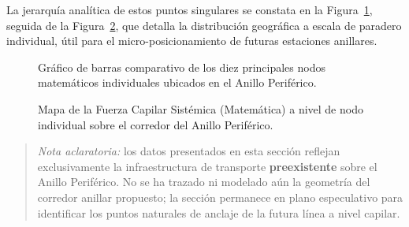 La jerarquía analítica de estos puntos singulares se constata en la
Figura~\ref{fig:barplot-nodos-periferico}, seguida de la
Figura~\ref{fig:mapa-nodos-periferico}, que detalla la distribución geográfica a
escala de paradero individual, útil para el micro-posicionamiento de futuras
estaciones anillares.

\begin{figure}[H]
    \centering
    \caption[Fuerza Capilar de nodos individuales en Anillo Periférico]{
    Gráfico de barras comparativo de los diez principales nodos matemáticos
    individuales ubicados en el Anillo Periférico.}
    \label{fig:barplot-nodos-periferico}
\end{figure}

\begin{figure}[H]
    \centering
    \caption[Distribución espacial de nodos matemáticos en el Periférico]{Mapa
    de la Fuerza Capilar Sistémica (Matemática) a nivel de nodo individual sobre
    el corredor del Anillo Periférico.}
    \label{fig:mapa-nodos-periferico}
\end{figure}

\vspace{2ex}
\begin{quote}
    \small\textit{Nota aclaratoria:} los datos presentados en esta sección
    reflejan exclusivamente la infraestructura de transporte \textbf{preexistente}
    sobre el Anillo Periférico. No se ha trazado ni modelado aún la geometría
    del corredor anillar propuesto; la sección permanece en plano especulativo
    para identificar los puntos naturales de anclaje de la futura línea a nivel
    capilar.
\end{quote}
\DIFaddbegin 


